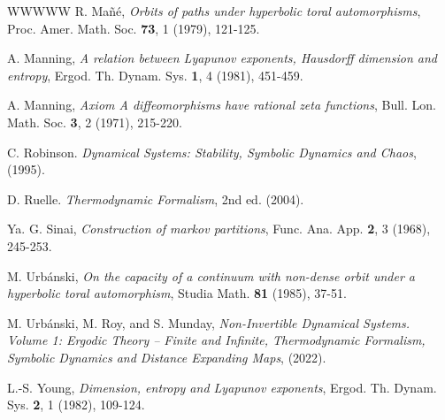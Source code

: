 \documentclass{article}
\begin{document}
\begin{thebibliography}{WWWWW}
     R. Mañé, {\em Orbits of paths under hyperbolic toral automorphisms}, Proc. Amer. Math. Soc. {\bf 73}, 1 (1979), 121-125.

     A. Manning, {\em A relation between Lyapunov exponents, Hausdorff dimension and entropy}, Ergod. Th. Dynam. Sys. {\bf 1}, 4 (1981), 451-459.

     A. Manning, {\em Axiom A diffeomorphisms have rational zeta functions}, Bull. Lon. Math. Soc. {\bf 3}, 2 (1971), 215-220.

     C. Robinson. {\em Dynamical Systems: Stability, Symbolic Dynamics and Chaos}, (1995).
   
     D. Ruelle. {\em Thermodynamic Formalism}, 2nd ed. (2004).
    
     Ya. G. Sinai, {\em Construction of markov partitions},  Func. Ana. App. {\bf 2}, 3 (1968), 245-253.

     M. Urbánski, {\em On the capacity of a continuum with non-dense orbit under a hyperbolic toral automorphism}, Studia Math. {\bf 81} (1985), 37-51.

     M. Urbánski, M. Roy, and S. Munday, {\em Non-Invertible Dynamical Systems. Volume 1: Ergodic Theory – Finite and Infinite, Thermodynamic Formalism, Symbolic Dynamics and Distance Expanding Maps}, (2022). 

     L.-S. Young, {\em Dimension, entropy and Lyapunov exponents}, Ergod. Th. Dynam. Sys. {\bf 2}, 1 (1982), 109-124.


	
\end{thebibliography}	
\end{document}
